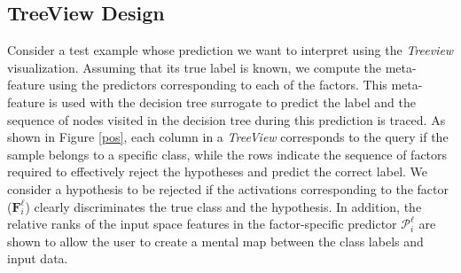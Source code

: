 \documentclass[final]{article}
\begin{document}
\subsection{TreeView Design}
Consider a test example whose prediction we want to interpret using the \textit{Treeview} visualization. Assuming that its true label is known, we compute the meta-feature using the predictors corresponding to each of the factors. This meta-feature is used with the decision tree surrogate to predict the label and the sequence of nodes visited in the decision tree during this prediction is traced. As shown in Figure \ref{pos}, each column in a \textit{TreeView} corresponds to the query if the sample belongs to a specific class, while the rows indicate the sequence of factors required to effectively reject the hypotheses and predict the correct label. We consider a hypothesis to be rejected if the activations corresponding to the factor ($\mathbf{F}^{\ell}_i$) clearly discriminates the true class and the hypothesis. In addition, the relative ranks of the input space features in the factor-specific predictor $\mathcal{P}^{\ell}_i$ are shown to allow the user to create a mental map between the class labels and input data.
\end{document}
